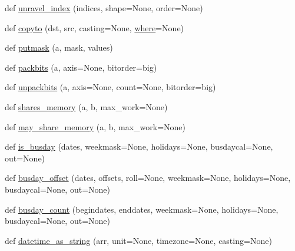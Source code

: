 \begin{DoxyCompactItemize}
\item 
def \hyperlink{namespacenumpy_1_1core_1_1multiarray_aa4db85fae51a0e6ca2240e6a33cce469}{unravel\+\_\+index} (indices, shape=None, order=None)
\item 
def \hyperlink{namespacenumpy_1_1core_1_1multiarray_a878552fb00620ce0518647ec8148c123}{copyto} (dst, src, casting=None, \hyperlink{namespacenumpy_1_1core_1_1multiarray_a8ce110e08e21273e014fdd160d5a14f3}{where}=None)
\item 
def \hyperlink{namespacenumpy_1_1core_1_1multiarray_a170d0890b78c0b73506f557579f30b95}{putmask} (a, mask, values)
\item 
def \hyperlink{namespacenumpy_1_1core_1_1multiarray_abfafab2ece88862a79bce7aa911fe5c5}{packbits} (a, axis=None, bitorder=\textquotesingle{}big\textquotesingle{})
\item 
def \hyperlink{namespacenumpy_1_1core_1_1multiarray_a5558cec206f367bd85f9669684ed069e}{unpackbits} (a, axis=None, count=None, bitorder=\textquotesingle{}big\textquotesingle{})
\item 
def \hyperlink{namespacenumpy_1_1core_1_1multiarray_a317d5a0ab00fc014e007bf3c0aea238b}{shares\+\_\+memory} (a, b, max\+\_\+work=None)
\item 
def \hyperlink{namespacenumpy_1_1core_1_1multiarray_a7d65467076a29d5822e5eba27f5bf779}{may\+\_\+share\+\_\+memory} (a, b, max\+\_\+work=None)
\item 
def \hyperlink{namespacenumpy_1_1core_1_1multiarray_a51bb1d46fa467937b809e5b19ed0a568}{is\+\_\+busday} (dates, weekmask=None, holidays=None, busdaycal=None, out=None)
\item 
def \hyperlink{namespacenumpy_1_1core_1_1multiarray_a08438fa4045c8d1a7c606aa38904f4f3}{busday\+\_\+offset} (dates, offsets, roll=None, weekmask=None, holidays=None, busdaycal=None, out=None)
\item 
def \hyperlink{namespacenumpy_1_1core_1_1multiarray_a03866a1d6f9ba260909213d4356fedda}{busday\+\_\+count} (begindates, enddates, weekmask=None, holidays=None, busdaycal=None, out=None)
\item 
def \hyperlink{namespacenumpy_1_1core_1_1multiarray_a11d8d711b88119055158c62a2dd39824}{datetime\+\_\+as\+\_\+string} (arr, unit=None, timezone=None, casting=None)
\end{DoxyCompactItemize}
